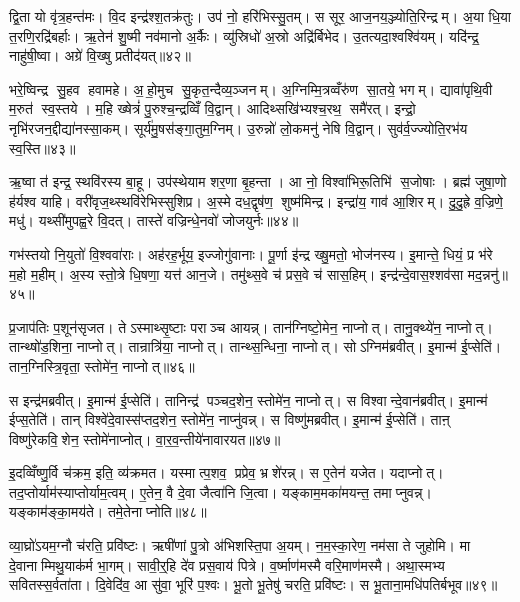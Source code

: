 द्वि॒ता यो वृ॑त्र॒हन्त॑मः। वि॒द इन्द्र॑श्श॒तक्र॑तुः। उप॑ नो॒ हरि॑भिस्सु॒तम्। स सूर॒ आज॒नय॒ञ्ज्योति॒रिन्द्रम्। अ॒या धि॒या त॒रणि॒रद्रि॑बर्\mbox{}हाः। ऋ॒तेन॑ शु॒ष्मी नव॑मानो अ॒र्कैः। व्यु॑स्रिधो॑ अ॒स्रो अद्रि॑र्बिभेद। उ॒तत्यदा॒श्वश्वि॑यम्। यदि॑न्द्र॒ नाहु॑षी॒ष्वा। अग्रे॑ वि॒ख्षु प्रतीद॑यत्॥४२॥

भरे॒ष्विन्द्र सु॒हव हवामहे। अ॒हो॒मुच सु॒कृत॒न्दैव्य॒ञ्जनम्। अ॒ग्निम्मि॒त्रव्वँरु॑ण सा॒तये॒ भगम्। द्यावा॑पृथि॒वी म॒रुत॑ स्व॒स्तये। म॒हि ख्षेत्रं॑ पु॒रुश्च॒न्द्रव्विँ वि॒द्वान्। आदिथ्सखि॑भ्यश्च॒रथ॒ समै॑रत्। इन्द्रो॒ नृभि॑रजन॒द्दीद्या॑नस्सा॒कम्। सूर्य॑मु॒षस॑ङ्गा॒तुम॒ग्निम्। उ॒रुन्नो॑ लो॒कमनु॑ नेषि वि॒द्वान्। सुव॑र्व॒ज्ज्योति॒रभ॑य स्व॒स्ति॥४३॥

ऋ॒ष्वा त॑ इन्द्र॒ स्थवि॑रस्य बा॒हू। उप॑स्थेयाम शर॒णा बृ॒हन्ता। आ नो॒ विश्वा॑भिरू॒तिभि॑ स॒जोषाः। ब्रह्म॑ जुषा॒णो ह॑र्यश्व याहि। वरी॑वृज॒थ्स्थवि॑रेभिस्सुशिप्र। अ॒स्मे दध॒द्वृष॑ण॒ शुष्म॑मिन्द्र। इन्द्रा॑य॒ गाव॑ आ॒शिरम्। दु॒दु॒ह्रे व॒ज्रिणे॒ मधु॑। यथ्सी॑मुपह्व॒रे वि॒दत्। तास्ते॑ वज्रिन्धे॒नवो॑ जोजयुर्नः॥४४॥

गभ॑स्तयो नि॒युतो॑ वि॒श्ववा॑राः। अह॑रह॒र्भूय॒ इज्जोगु॑वानाः। पू॒र्णा इ॑न्द्र ख्षु॒मतो॒ भोज॑नस्य। इ॒मान्ते॒ धियं॒ प्र भ॑रे म॒हो म॒हीम्। अ॒स्य स्तो॒त्रे धि॒षणा॒ यत्त॑ आन॒जे। तमु॑थ्स॒वे च॑ प्रस॒वे च॑ सास॒हिम्। इन्द्र॑न्दे॒वास॒श्शव॑सा मद॒न्ननु॑॥४५॥\anuvakamend[व॒ज्रिण॑मयथ्स्व॒स्ति जो॑जयुर्नस्स॒प्त च॑]

प्र॒जाप॑तिः प॒शून॑सृजत। तेऽस्माथ्सृ॒ष्टाः पराञ्च आयन्न्। तान॑ग्निष्टो॒मेन॒ नाप्नोत्। तानु॒क्थ्ये॑न॒ नाप्नोत्। तान्थ्षो॑ड॒शिना॒ नाप्नोत्। तान्रात्रि॑या॒ नाप्नोत्। तान्थ्स॒न्धिना॒ नाप्नोत्। सोऽग्निम॑ब्रवीत्। इ॒मान्म॑ ई॒प्सेति॑। तान॒ग्निस्त्रि॒वृता॒ स्तोमे॑न॒ नाप्नोत्॥४६॥

स इन्द्र॑मब्रवीत्। इ॒मान्म॑ ई॒प्सेति॑। तानिन्द्र॑ पञ्चद॒शेन॒ स्तोमे॑न॒ नाप्नोत्। स विश्वान्दे॒वान॑ब्रवीत्। इ॒मान्म॑ ईप्स॒तेति॑। तान् विश्वे॑दे॒वास्स॑प्तद॒शेन॒ स्तोमे॑न॒ नाप्नु॑वन्न्। स विष्णु॑मब्रवीत्। इ॒मान्म॑ ई॒प्सेति॑। ताऩ् विष्णु॑रेकवि॒शेन॒ स्तोमे॑नाप्नोत्। वा॒र॒व॒न्तीये॑नावारयत॥४७॥

इ॒दव्विँष्णु॒र्वि च॑क्रम॒ इति॒ व्य॑क्रमत। यस्मात्प॒शव॒ प्रप्रेव॒ भ्रशे॑रन्न्। स ए॒तेन॑ यजेत। यदाप्नोत्। तद॒प्तोर्याम॑स्याप्तोर्याम॒त्वम्। ए॒तेन॒ वै दे॒वा जैत्वा॑नि जि॒त्वा। यङ्काम॒मका॑मयन्त॒ तमाप्नुवन्न्। यङ्काम॑ङ्का॒मय॑ते। तमे॒तेनाप्नोति॥४८॥\anuvakamend[स्तोमे॑न॒ नाप्नो॑दवारयत॒ नव॑ च]

व्या॒घ्रो॑ऽयम॒ग्नौ च॑रति॒ प्रवि॑ष्टः। ऋषी॑णां पु॒त्रो अ॑भिशस्ति॒पा अ॒यम्। न॒म॒स्का॒रेण॒ नम॑सा ते जुहोमि। मा दे॒वानाम्मिथु॒याक॑र्म भा॒गम्। सावी॒र्॒हि दे॑व प्रस॒वाय॑ पित्रे। व॒र्ष्माण॑मस्मै वरि॒माण॑मस्मै। अथा॒स्मभ्य सवितस्स॒र्वता॑ता। दि॒वेदि॑व॒ आ सु॑वा॒ भूरि॑ प॒श्वः। भू॒तो भू॒तेषु॑ चरति॒ प्रवि॑ष्टः। स भू॒ताना॒मधि॑पतिर्बभूव॥४९॥

